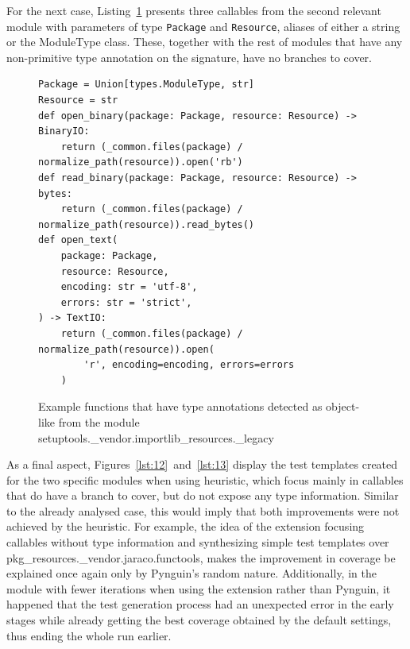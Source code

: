 \documentclass[%
  chapterprefix=false,%
  open=right,%
  twoside=true,%
  paper=a4,%
  logofile={Figures/logo.png},%
  thesistype=master,%
  UKenglish,%
]{se2thesis}
\newcommand{\classname}[1]{\texttt{#1}}
\begin{document}
For the next case, Listing~\ref{lst:11} presents three callables from the second relevant module with parameters of type \classname{Package} and \classname{Resource}, aliases of either a string or the ModuleType class.
These, together with the rest of modules that have any non-primitive type annotation on the signature, have no branches to cover.

\begin{figure}[thbp]
\begin{verbatim}
Package = Union[types.ModuleType, str]
Resource = str
def open_binary(package: Package, resource: Resource) -> BinaryIO:
    return (_common.files(package) / normalize_path(resource)).open('rb')
def read_binary(package: Package, resource: Resource) -> bytes:
    return (_common.files(package) / normalize_path(resource)).read_bytes()
def open_text(
    package: Package,
    resource: Resource,
    encoding: str = 'utf-8',
    errors: str = 'strict',
) -> TextIO:
    return (_common.files(package) / normalize_path(resource)).open(
        'r', encoding=encoding, errors=errors
    )
\end{verbatim}
\caption{Example functions that have type annotations detected as object-like from the module setuptools.\_vendor.importlib\_resources.\_legacy}\label{lst:11}
\end{figure}

As a final aspect, Figures~\ref{lst:12}~and~\ref{lst:13} display the test templates created for the two specific modules when using heuristic, which focus mainly in callables that do have a branch to cover, but do not expose any type information.
Similar to the already analysed case, this would imply that both improvements were not achieved by the heuristic.
For example, the idea of the extension focusing callables without type information and synthesizing simple test templates over pkg\_resources.\_vendor.jaraco.functools, makes the improvement in coverage be explained once again only by Pynguin's random nature.
Additionally, in the module with fewer iterations when using the extension rather than Pynguin, it happened that the test generation process had an unexpected error in the early stages while already getting the best coverage obtained by the default settings, thus ending the whole run earlier. 
\end{document}

